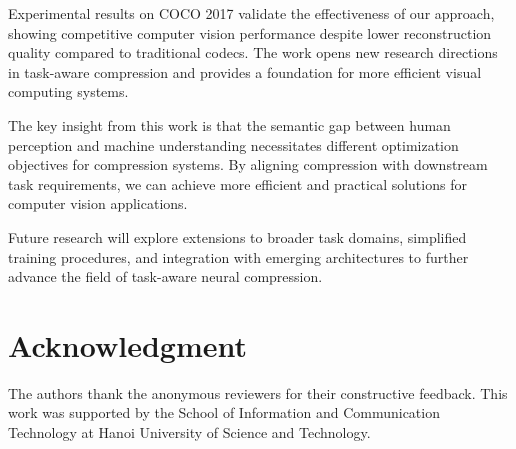 \documentclass[conference]{IEEEtran}
\begin{document}
Experimental results on COCO 2017 validate the effectiveness of our approach, showing competitive computer vision performance despite lower reconstruction quality compared to traditional codecs. The work opens new research directions in task-aware compression and provides a foundation for more efficient visual computing systems.

The key insight from this work is that the semantic gap between human perception and machine understanding necessitates different optimization objectives for compression systems. By aligning compression with downstream task requirements, we can achieve more efficient and practical solutions for computer vision applications.

Future research will explore extensions to broader task domains, simplified training procedures, and integration with emerging architectures to further advance the field of task-aware neural compression.

\section*{Acknowledgment}

The authors thank the anonymous reviewers for their constructive feedback. This work was supported by the School of Information and Communication Technology at Hanoi University of Science and Technology.
\end{document}
